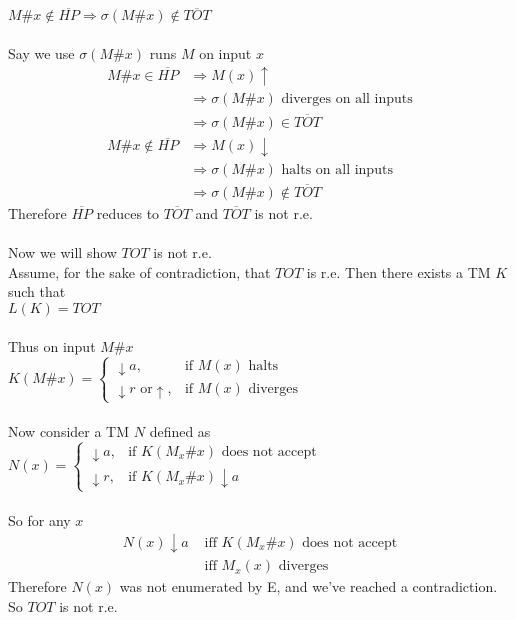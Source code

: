 \documentclass[12pt]{article}
\begin{document}
$M\#x \notin \overline{HP} \Rightarrow \sigma(M\#x) \notin \overline{TOT}$\\
\\
Say we use $\sigma(M\#x)$ runs $M$ on input $x$\\
\begin{align*}
  M\#x \in \overline{HP} & \Rightarrow M(x)\uparrow\\
                          & \Rightarrow \sigma(M\#x) \mbox{ diverges on all inputs}\\
                          & \Rightarrow \sigma(M\#x) \in \overline{TOT}\\
  M\#x \notin \overline{HP} & \Rightarrow M(x) \downarrow\\ 
                            & \Rightarrow \sigma(M\#x) \mbox{ halts on all inputs}\\
                            & \Rightarrow \sigma(M\#x) \notin \overline{TOT}
\end{align*}
Therefore $\overline{HP}$ reduces to $\overline{TOT}$ and $\overline{TOT}$ is
not r.e.\\
\\
Now we will show $TOT$ is not r.e.\\
Assume, for the sake of contradiction, that $TOT$ is r.e. Then there exists a TM $K$
such that\\

$L(K) = TOT$\\
\\
Thus on input $M\#x$\\

$K(M\#x) = \begin{cases}
              \downarrow a, & \mbox{if } M(x) \mbox{ halts}\\
              \downarrow r \mbox{ or} \uparrow, & \mbox{if } M(x) \mbox{ diverges}
            \end{cases}$\\
\\
Now consider a TM $N$ defined as\\

$N(x) = \begin{cases}
          \downarrow a, & \mbox{if } K(M_x\#x) \mbox{ does not accept}\\
          \downarrow r, & \mbox{if } K(M_x\#x) \downarrow a
        \end{cases}$\\
\\            
So for any $x$
\begin{align*}
  N(x) \downarrow a & \mbox{ iff } K(M_x\#x) \mbox{ does not accept} \\
                    & \mbox{ iff } M_x(x) \mbox{ diverges}
\end{align*}
Therefore $N(x)$ was not enumerated by E, and we've reached a contradiction. So 
$TOT$ is not r.e.
\end{document}
